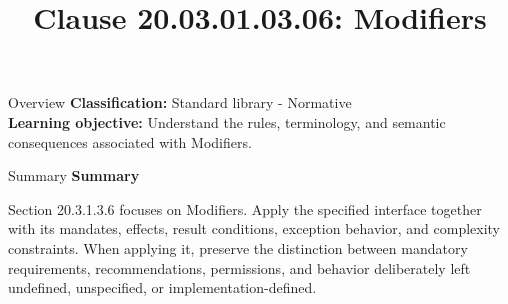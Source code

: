 \documentclass[10pt,letterpaper]{article}
\title{Clause 20.03.01.03.06: Modifiers}
\author{}
\date{}
\begin{document}
\maketitle
\begin{CornellOverviewBox}{Overview}
\textbf{Classification:} Standard library - Normative\\[2pt]
\textbf{Learning objective:} Understand the rules, terminology, and semantic consequences associated with Modifiers.
\end{CornellOverviewBox}\begin{CornellSummaryBox}{Summary}
{\sffamily\bfseries\color{Accent} Summary}\par\vspace{3pt}Section 20.3.1.3.6 focuses on Modifiers. Apply the specified interface together with its mandates, effects, result conditions, exception behavior, and complexity constraints. When applying it, preserve the distinction between mandatory requirements, recommendations, permissions, and behavior deliberately left undefined, unspecified, or implementation-defined.
\end{CornellSummaryBox}
\end{document}
